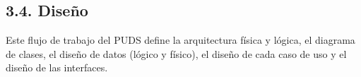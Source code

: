 \subsection{3.4. Diseño}\label{sec:v2_diseno}

Este flujo de trabajo del PUDS define la arquitectura física y lógica, el diagrama de clases, el diseño de datos (lógico y físico), el diseño de cada caso de uso y el diseño de las interfaces.






